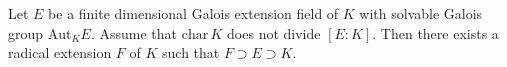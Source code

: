 Let $E$ be a finite dimensional Galois extension field of $K$ with solvable Galois group $\mathrm{Aut}_K E$. Assume that $\mathrm{char}\,K$ does not divide $[E : K]$. Then there exists a radical extension $F$ of $K$ such that $F \supset E \supset K$.

